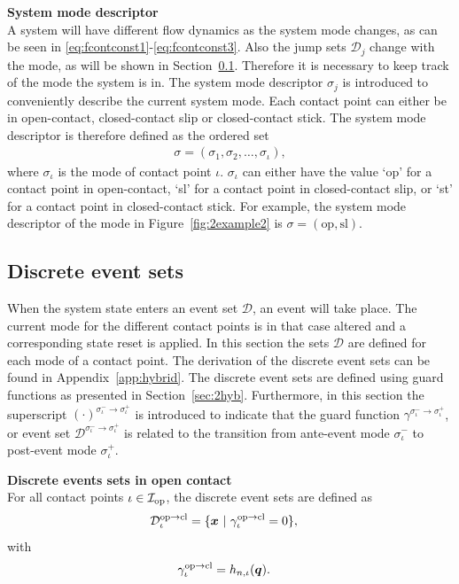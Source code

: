 \documentclass[../DC2017114Bouma.tex]{subfiles}
\begin{document}
\textbf{System mode descriptor}\\
A system will have different flow dynamics as the system mode changes, as can be seen in \eqref{eq:fcontconst1}-\eqref{eq:fcontconst3}. Also the jump sets $\mathcal{D}_j$ change with the mode, as will be shown in Section~\ref{sec:2event}. Therefore it is necessary to keep track of the mode the system is in. The system mode descriptor $\sigma_j$ is introduced to conveniently describe the current system mode. Each contact point can either be in open-contact, closed-contact slip or closed-contact stick. The system mode descriptor is therefore defined as the ordered set
\begin{align}
\sigma = (\sigma_1,\sigma_2,\dots,\sigma_\iota),
\end{align}
where $\sigma_\iota$ is the mode of contact point $\iota$. $\sigma_\iota$ can either have the value `op' for a contact point in open-contact, `sl' for a contact point in closed-contact slip, or `st' for a contact point in closed-contact stick. For example, the system mode descriptor of the mode in Figure~\ref{fig:2example2} is $\sigma = (\text{op},\text{sl})$.

\subsection{Discrete event sets}\label{sec:2event}
When the system state enters an event set $\mathcal{D}$, an event will take place. The current mode for the different contact points is in that case altered and a corresponding state reset is applied. In this section the sets $\mathcal{D}$ are defined for each mode of a contact point. The derivation of the discrete event sets can be found in Appendix~\ref{app:hybrid}. The discrete event sets are defined using guard functions as presented in Section~\ref{sec:2hyb}. Furthermore, in this section the superscript $(\cdot)^{\sigma_\iota^-\rightarrow\sigma_\iota^+}$ is introduced to indicate that the guard function $\gamma^{\sigma_\iota^-\rightarrow\sigma_\iota^+}$, or event set $\mathcal{D}^{\sigma_\iota^-\rightarrow\sigma_\iota^+}$ is related to the transition from ante-event mode $\sigma_\iota^-$ to post-event mode $\sigma_\iota^+$.

\textbf{Discrete events sets in open contact}\\
For all contact points $\iota\in\mathcal{I}_{\text{op}}$, the discrete event sets are defined as
\begin{align}
\mathcal{D}^{\text{op}\rightarrow\text{cl}}_{\iota} &= \{ \xb\ |\ \gamma^{\text{op}\rightarrow\text{cl}}_{\iota} = 0 \},\label{eq:2Dopcl}
\end{align}
%
with
\begin{align}
\gamma^{\text{op}\rightarrow\text{cl}}_{\iota} &= h_{n,\iota}({\boldsymbol{q}}).
\end{align}
\end{document}
